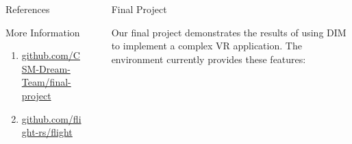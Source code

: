 \documentclass[final]{beamer}
\newlength{\sepwid}
\newlength{\onecolwid}
\begin{document}
\begin{frame}[t]
\begin{columns}[t]
\begin{column}{\onecolwid}
                \begin{block}{References}
                    \printbibliography
                \end{block}


                \begin{alertblock}{More Information}

                    \begin{enumerate}[leftmargin=6.5cm, labelsep=1cm]

                        \item[\textbf{Project}]
                            \href{https://github.com/CSM-Dream-Team/final-project}{\url{github.com/CSM-Dream-Team/final-project}}

                        \item[\textbf{Flight}]
                            \href{https://github.com/flight-rs/flight}{\url{github.com/flight-rs/flight}}
                    \end{enumerate}

                \end{alertblock}
            \end{column} %

            \begin{column}{\sepwid}\end{column} %

            \begin{column}{\onecolwid} %

                \begin{block}{Final Project}
                    \setlength{\parskip}{0.5em}

                    Our final project demonstrates the results of using DIM to
                    implement a complex VR application. The environment
                    currently provides these features:
                    \begin{itemize}


\end{itemize}
\end{block}
\end{column}
\end{columns}
\end{frame}
\end{document}

